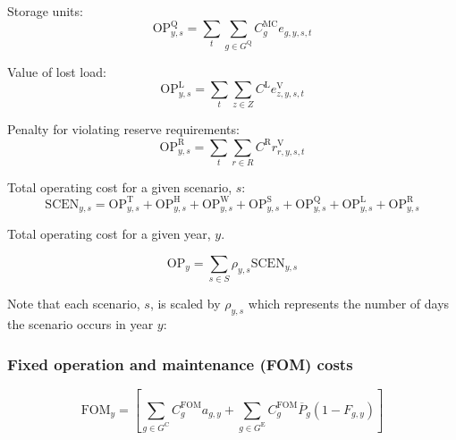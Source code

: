 \documentclass{article}
\newcommand{\sGeneratorsExisting}{G^{\mathrm{E}}}
\newcommand{\sGeneratorsCandidate}{G^{\mathrm{C}}}
\newcommand{\sStorage}{G^{\mathrm{Q}}}
\newcommand{\sScenarios}{S}
\newcommand{\sZones}{Z}
\newcommand{\sRegions}{R}
\newcommand{\iGenerator}{g}
\newcommand{\iYear}{y}
\newcommand{\iScenario}{s}
\newcommand{\iInterval}{t}
\newcommand{\iZone}{z}
\newcommand{\iRegion}{r}
\newcommand{\cOperatingCost}[1][\iYear,\iScenario]{\mathrm{OP}_{#1}}
\newcommand{\cOperatingCostThermal}[1][\iYear,\iScenario]{\mathrm{OP}^{\mathrm{T}}_{#1}}
\newcommand{\cOperatingCostHydro}[1][\iYear,\iScenario]{\mathrm{OP}^{\mathrm{H}}_{#1}}
\newcommand{\cOperatingCostWind}[1][\iYear,\iScenario]{\mathrm{OP}^{\mathrm{W}}_{#1}}
\newcommand{\cOperatingCostSolar}[1][\iYear,\iScenario]{\mathrm{OP}^{\mathrm{S}}_{#1}}
\newcommand{\cOperatingCostStorage}[1][\iYear,\iScenario]{\mathrm{OP}^{\mathrm{Q}}_{#1}}
\newcommand{\cFixedOperationsMaintenanceCost}[1][\iYear]{\mathrm{FOM}_{#1}}
\newcommand{\cFixedOperationsMaintenanceCostGenerator}[1][\iGenerator]{C^{\mathrm{FOM}}_{#1}}
\newcommand{\cScenarioDuration}[1][\iYear,\iScenario]{\rho_{#1}}
\newcommand{\cMarginalCost}[1][\iGenerator,\iYear]{C^{\mathrm{MC}}_{#1}}
\newcommand{\cPowerOutputMax}[1][\iGenerator,\iYear]{\overline{P}_{#1}}
\newcommand{\cOperatingCostLostLoad}[1][\iYear,\iScenario]{\mathrm{OP}^{\mathrm{L}}_{#1}}
\newcommand{\cLostLoadCost}{C^{\mathrm{L}}}
\newcommand{\cReserveUpViolationPenalty}{C^{\mathrm{R}}}
\newcommand{\cOperatingCostReserveUpViolation}[1][\iYear,\iScenario]{\mathrm{OP}^{\mathrm{R}}_{#1}}
\newcommand{\cOperatingCostScenario}[1][\iYear,\iScenario]{\mathrm{SCEN}_{#1}}
\newcommand{\cRetirementIndicator}[1][\iGenerator,\iYear]{F_{#1}}
\newcommand{\vEnergy}[1][\iGenerator,\iYear,\iScenario,\iInterval]{e_{#1}}
\newcommand{\vReserveUpViolation}[1][\iRegion,\iYear,\iScenario,\iInterval]{r^{\mathrm{V}}_{#1}}
\newcommand{\vLostLoadEnergy}[1][\iZone,\iYear,\iScenario,\iInterval]{e^{\mathrm{V}}_{#1}}
\newcommand{\vInstalledCapacityTotal}[1][\iGenerator,\iYear]{a_{#1}}
\begin{document}
Storage units:
\begin{equation}
\cOperatingCostStorage = \sum\limits_{\iInterval}\sum\limits_{\iGenerator \in \sStorage} \cMarginalCost[\iGenerator] \vEnergy
\end{equation}

Value of lost load:
\begin{equation}
\cOperatingCostLostLoad = \sum\limits_{\iInterval}\sum\limits_{\iZone \in \sZones} \cLostLoadCost \vLostLoadEnergy
\end{equation}

Penalty for violating reserve requirements:
\begin{equation}
\cOperatingCostReserveUpViolation = \sum\limits_{\iInterval}\sum\limits_{\iRegion \in \sRegions} \cReserveUpViolationPenalty \vReserveUpViolation
\end{equation}

Total operating cost for a given scenario, $\iScenario$:
\begin{equation}
\cOperatingCostScenario = \cOperatingCostThermal + \cOperatingCostHydro + \cOperatingCostWind + \cOperatingCostSolar + \cOperatingCostStorage + \cOperatingCostLostLoad + \cOperatingCostReserveUpViolation
\end{equation}

Total operating cost for a given year, $\iYear$.

\begin{equation}
\cOperatingCost[\iYear] = \sum\limits_{\iScenario \in \sScenarios} \cScenarioDuration \cOperatingCostScenario
\end{equation}

Note that each scenario, $\iScenario$, is scaled by $\cScenarioDuration$ which represents the number of days the scenario occurs in year $\iYear$:

\subsubsection{Fixed operation and maintenance (FOM) costs}

\begin{equation}
\cFixedOperationsMaintenanceCost = \left[\sum\limits_{\iGenerator \in \sGeneratorsCandidate} \cFixedOperationsMaintenanceCostGenerator \vInstalledCapacityTotal + \sum\limits_{\iGenerator \in \sGeneratorsExisting} \cFixedOperationsMaintenanceCostGenerator \cPowerOutputMax[\iGenerator] \left(1 - \cRetirementIndicator\right) \right]
\end{equation}
\end{document}
